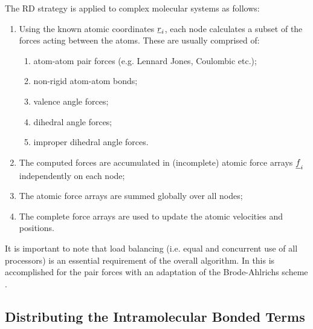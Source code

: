 The RD strategy is applied to complex molecular systems as follows:
\begin{enumerate}
\item Using the known atomic coordinates $\mbox{$\underline{r}$}_{i}$, each node
calculates
a subset of the forces acting between the atoms. These are usually
comprised of:
\begin{enumerate}
\item atom-atom pair forces (e.g. Lennard Jones, Coulombic etc.);
\item non-rigid atom-atom bonds;
\item valence angle forces;
\item dihedral angle forces;
\item improper dihedral angle forces.
\end{enumerate}
\item The computed forces are accumulated in (incomplete) atomic 
force arrays $\mbox{$\underline{f}$}_{i}$ independently on each node;
\item The atomic force arrays are summed globally over all nodes;
\item The complete force arrays are used to update the atomic
velocities and positions.
\end{enumerate}
It is important to note that load balancing (i.e. equal and concurrent
use of all processors) is an essential requirement of the overall
algorithm. In \D{} this is accomplished for the pair forces with an
adaptation of the Brode-Ahlrichs scheme \cite{brode-86a}.


\subsection{Distributing the Intramolecular Bonded Terms}

